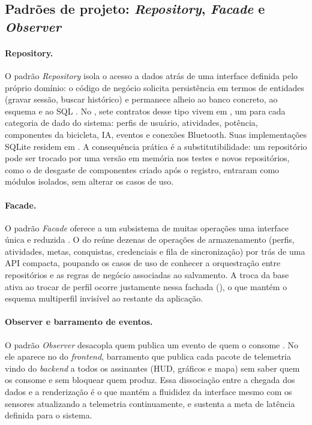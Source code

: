 \subsection{Padrões de projeto: \textit{Repository}, \textit{Facade} e \textit{Observer}}
\label{sec:padroes}

\paragraph{Repository.} O padrão \textit{Repository} isola o acesso a dados
atrás de uma interface definida pelo próprio domínio: o código de negócio
solicita persistência em termos de entidades (gravar sessão, buscar histórico)
e permanece alheio ao banco concreto, ao esquema e ao SQL \cite{gof1995}. No
\argus{}, sete contratos desse tipo vivem em
, um para cada categoria de dado do
sistema: perfis de usuário, atividades, potência, componentes da bicicleta,
IA, eventos e conexões Bluetooth. Suas implementações SQLite residem em
. A consequência prática é a
substitutibilidade: um repositório pode ser trocado por uma versão em memória
nos testes e novos repositórios, como o de desgaste de componentes criado
após o registro, entraram como módulos isolados, sem alterar os casos de uso.

\paragraph{Facade.} O padrão \textit{Facade} oferece a um subsistema de muitas
operações uma interface única e reduzida \cite{gof1995}. O
 do \argus{} reúne dezenas de operações de armazenamento
(perfis, atividades, metas, conquistas, credenciais e fila de sincronização)
por trás de uma API compacta, poupando os casos de uso de conhecer a
orquestração entre repositórios e as regras de negócio associadas ao
salvamento. A troca da base ativa ao trocar de perfil ocorre justamente nessa
fachada (), o que mantém o esquema multiperfil
invisível ao restante da aplicação.

\paragraph{Observer e barramento de eventos.} O padrão \textit{Observer}
desacopla quem publica um evento de quem o consome \cite{gof1995}. No \argus{}
ele aparece no  do \textit{frontend}, barramento que
publica cada pacote de telemetria vindo do \textit{backend} a todos os
assinantes (HUD, gráficos e mapa) sem saber quem os consome e sem bloquear
quem produz. Essa dissociação entre a chegada dos dados e a renderização é o
que mantém a fluididez da interface mesmo com os sensores atualizando a
telemetria continuamente, e sustenta a meta de latência definida para o
sistema.

